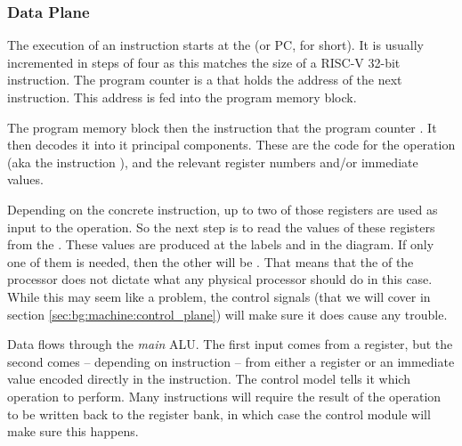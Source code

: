 \subsubsection{Data Plane}

The execution of an instruction starts at the  (or PC, for short). It is usually incremented in steps of four as this matches the size of a RISC-V 32-bit instruction. The program counter is a  that holds the address of the next instruction. This address is fed into the program memory block.

The program memory block then  the instruction that the program counter . It then decodes it into it principal components. These are the code for the operation (aka the instruction ), and the relevant register numbers and/or immediate values.

Depending on the concrete instruction, up to two of those registers are used as input to the operation. So the next step is to read the values of these registers from the . These values are produced at the labels  and  in the diagram. If only one of them is needed, then the other will be . That means that the  of the processor does not dictate what any physical processor should do in this case. While this may seem like a problem, the control signals (that we will cover in section \ref{sec:bg:machine:control_plane}) will make sure it does cause any trouble.

Data flows through the \textsl{main} ALU. The first input comes from a register, but the second comes -- depending on instruction -- from either a register or an immediate value encoded directly in the instruction. The control model tells it which operation to perform. Many instructions will require the result of the operation to be written back to the register bank, in which case the control module will make sure this happens.

